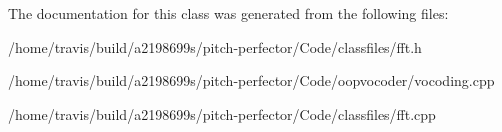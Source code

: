 The documentation for this class was generated from the following files\-:\begin{DoxyCompactItemize}
\item 
/home/travis/build/a2198699s/pitch-\/perfector/\-Code/classfiles/fft.\-h\item 
/home/travis/build/a2198699s/pitch-\/perfector/\-Code/oopvocoder/vocoding.\-cpp\item 
/home/travis/build/a2198699s/pitch-\/perfector/\-Code/classfiles/fft.\-cpp\end{DoxyCompactItemize}
